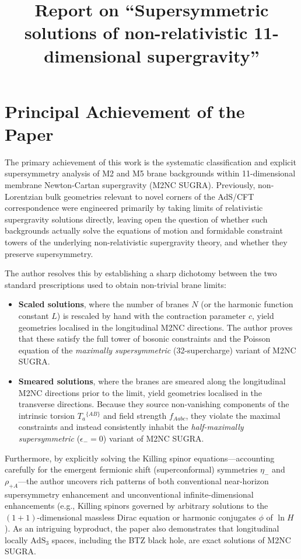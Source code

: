 \documentclass[11pt,a4paper]{article}
\title{\textbf{Report on ``Supersymmetric solutions of non-relativistic 11-dimensional supergravity''}}
\author{}
\date{}
\begin{document}
\maketitle
\vspace{-2em}

\section{Principal Achievement of the Paper}

The primary achievement of this work is the systematic classification and explicit supersymmetry analysis of M2 and M5 brane backgrounds within 11-dimensional membrane Newton-Cartan supergravity (M2NC SUGRA). Previously, non-Lorentzian bulk geometries relevant to novel corners of the AdS/CFT correspondence were engineered primarily by taking limits of relativistic supergravity solutions directly, leaving open the question of whether such backgrounds actually solve the equations of motion and formidable constraint towers of the underlying non-relativistic supergravity theory, and whether they preserve supersymmetry. 

The author resolves this by establishing a sharp dichotomy between the two standard prescriptions used to obtain non-trivial brane limits:
\begin{itemize}
    \item \textbf{Scaled solutions}, where the number of branes $N$ (or the harmonic function constant $L$) is rescaled by hand with the contraction parameter $c$, yield geometries localised in the longitudinal M2NC directions. The author proves that these satisfy the full tower of bosonic constraints and the Poisson equation of the \emph{maximally supersymmetric} (32-supercharge) variant of M2NC SUGRA.
    \item \textbf{Smeared solutions}, where the branes are smeared along the longitudinal M2NC directions prior to the limit, yield geometries localised in the transverse directions. Because they source non-vanishing components of the intrinsic torsion $T_{a}{}^{\{AB\}}$ and field strength $f_{Aabc}$, they violate the maximal constraints and instead consistently inhabit the \emph{half-maximally supersymmetric} ($\epsilon_- = 0$) variant of M2NC SUGRA.
\end{itemize}
Furthermore, by explicitly solving the Killing spinor equations---accounting carefully for the emergent fermionic shift (superconformal) symmetries $\eta_-$ and $\rho_{+A}$---the author uncovers rich patterns of both conventional near-horizon supersymmetry enhancement and unconventional infinite-dimensional enhancements (e.g., Killing spinors governed by arbitrary solutions to the $(1+1)$-dimensional massless Dirac equation or harmonic conjugates $\phi$ of $\ln H$). As an intriguing byproduct, the paper also demonstrates that longitudinal locally $\mathrm{AdS}_3$ spaces, including the BTZ black hole, are exact solutions of M2NC SUGRA.
\end{document}
